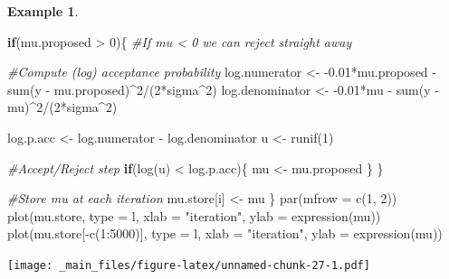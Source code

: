 \documentclass[
]{book}
\newenvironment{Shaded}{\begin{snugshade}}{\end{snugshade}}
\newcommand{\AttributeTok}[1]{\textcolor[rgb]{0.77,0.63,0.00}{#1}}
\newcommand{\CommentTok}[1]{\textcolor[rgb]{0.56,0.35,0.01}{\textit{#1}}}
\newcommand{\ControlFlowTok}[1]{\textcolor[rgb]{0.13,0.29,0.53}{\textbf{#1}}}
\newcommand{\DecValTok}[1]{\textcolor[rgb]{0.00,0.00,0.81}{#1}}
\newcommand{\FloatTok}[1]{\textcolor[rgb]{0.00,0.00,0.81}{#1}}
\newcommand{\FunctionTok}[1]{\textcolor[rgb]{0.00,0.00,0.00}{#1}}
\newcommand{\NormalTok}[1]{#1}
\newcommand{\OtherTok}[1]{\textcolor[rgb]{0.56,0.35,0.01}{#1}}
\newcommand{\SpecialCharTok}[1]{\textcolor[rgb]{0.00,0.00,0.00}{#1}}
\newcommand{\StringTok}[1]{\textcolor[rgb]{0.31,0.60,0.02}{#1}}
\theoremstyle{definition}
\theoremstyle{definition}
\newtheorem{example}{Example}[chapter]
\theoremstyle{definition}
\theoremstyle{definition}
\theoremstyle{remark}
\begin{document}
\begin{example}
\begin{Shaded}
\begin{Highlighting}[]
  \ControlFlowTok{if}\NormalTok{(mu.proposed }\SpecialCharTok{\textgreater{}} \DecValTok{0}\NormalTok{)\{ }\CommentTok{\#If mu \textless{} 0 we can reject straight away}
    
    \CommentTok{\#Compute (log) acceptance probability}
\NormalTok{    log.numerator   }\OtherTok{\textless{}{-}} \SpecialCharTok{{-}}\FloatTok{0.01}\SpecialCharTok{*}\NormalTok{mu.proposed }\SpecialCharTok{{-}} \FunctionTok{sum}\NormalTok{(y }\SpecialCharTok{{-}}\NormalTok{ mu.proposed)}\SpecialCharTok{\^{}}\DecValTok{2}\SpecialCharTok{/}\NormalTok{(}\DecValTok{2}\SpecialCharTok{*}\NormalTok{sigma}\SpecialCharTok{\^{}}\DecValTok{2}\NormalTok{)}
\NormalTok{    log.denominator }\OtherTok{\textless{}{-}} \SpecialCharTok{{-}}\FloatTok{0.01}\SpecialCharTok{*}\NormalTok{mu }\SpecialCharTok{{-}} \FunctionTok{sum}\NormalTok{(y }\SpecialCharTok{{-}}\NormalTok{ mu)}\SpecialCharTok{\^{}}\DecValTok{2}\SpecialCharTok{/}\NormalTok{(}\DecValTok{2}\SpecialCharTok{*}\NormalTok{sigma}\SpecialCharTok{\^{}}\DecValTok{2}\NormalTok{)}
    
\NormalTok{    log.p.acc }\OtherTok{\textless{}{-}}\NormalTok{ log.numerator }\SpecialCharTok{{-}}\NormalTok{ log.denominator}
\NormalTok{    u }\OtherTok{\textless{}{-}} \FunctionTok{runif}\NormalTok{(}\DecValTok{1}\NormalTok{)}
    
    \CommentTok{\#Accept/Reject step}
    \ControlFlowTok{if}\NormalTok{(}\FunctionTok{log}\NormalTok{(u) }\SpecialCharTok{\textless{}}\NormalTok{ log.p.acc)\{}
\NormalTok{      mu }\OtherTok{\textless{}{-}}\NormalTok{ mu.proposed}
\NormalTok{    \}}
\NormalTok{  \}}
  
  \CommentTok{\#Store mu at each iteration}
\NormalTok{  mu.store[i] }\OtherTok{\textless{}{-}}\NormalTok{ mu}
\NormalTok{\}}
\FunctionTok{par}\NormalTok{(}\AttributeTok{mfrow =} \FunctionTok{c}\NormalTok{(}\DecValTok{1}\NormalTok{, }\DecValTok{2}\NormalTok{))}
\FunctionTok{plot}\NormalTok{(mu.store, }\AttributeTok{type =} \StringTok{\textquotesingle{}l\textquotesingle{}}\NormalTok{, }\AttributeTok{xlab =} \StringTok{"iteration"}\NormalTok{, }\AttributeTok{ylab =} \FunctionTok{expression}\NormalTok{(mu))}
\FunctionTok{plot}\NormalTok{(mu.store[}\SpecialCharTok{{-}}\FunctionTok{c}\NormalTok{(}\DecValTok{1}\SpecialCharTok{:}\DecValTok{5000}\NormalTok{)], }\AttributeTok{type =} \StringTok{\textquotesingle{}l\textquotesingle{}}\NormalTok{, }\AttributeTok{xlab =} \StringTok{"iteration"}\NormalTok{, }\AttributeTok{ylab =} \FunctionTok{expression}\NormalTok{(mu))}
\end{Highlighting}
\end{Shaded}

\texttt{[image: \_main\_files/figure-latex/unnamed-chunk-27-1.pdf]}
\end{example}
\end{document}

